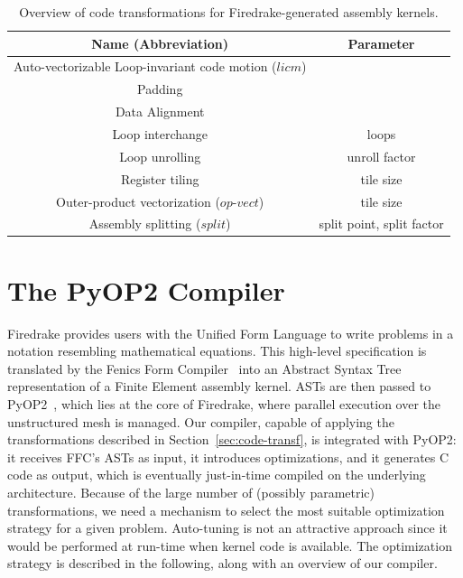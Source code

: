 \documentclass[conference]{IEEEtran}
\begin{document}
\begin{table}[h]
\begin{tabulary}{1.0\columnwidth}{|C|C|}
\hline
Name (Abbreviation) & Parameter \\\hline\hline
Auto-vectorizable Loop-invariant code motion ($licm$) &   \\ \hline
Padding &  \\ \hline
Data Alignment & \\ \hline
Loop interchange      & loops  \\ \hline
Loop unrolling  & unroll factor \\ \hline
Register tiling & tile size \\ \hline
Outer-product vectorization ($op$-$vect$) & tile size \\ \hline
Assembly splitting ($split$) & split point, split factor \\ \hline
\end{tabulary}
\caption{Overview of code transformations for Firedrake-generated assembly kernels.}
\label{table:code-transformations}
\end{table}


\section{The PyOP2 Compiler}
\label{sec:pyop2-compiler}

Firedrake provides users with the Unified Form Language to write problems in a notation resembling mathematical equations. This high-level specification is translated by the Fenics Form Compiler~\cite{ffc} into an Abstract Syntax Tree representation of a Finite Element assembly kernel. ASTs are then passed to PyOP2~\cite{pyop2isc}, which lies at the core of Firedrake, where parallel execution over the unstructured mesh is managed. Our compiler, capable of applying the transformations described in Section~\ref{sec:code-transf}, is integrated with PyOP2: it receives FFC's ASTs as input, it introduces optimizations, and it generates C code as output, which is eventually just-in-time compiled on the underlying architecture. Because of the large number of (possibly parametric) transformations, we need a mechanism to select the most suitable optimization strategy for a given problem. Auto-tuning is not an attractive approach since it would be performed at run-time when kernel code is available. The optimization strategy is described in the following, along with an overview of our compiler.
\end{document}
